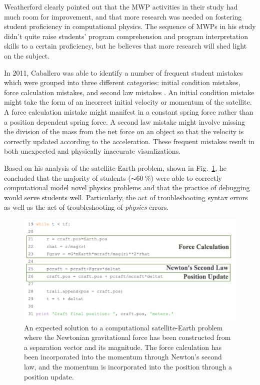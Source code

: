 \documentclass{msuphddissertation}
\begin{document}
\begin{doublespace}
Weatherford clearly pointed out that the MWP activities in their study had much room for improvement, and that more research was needed on fostering student proficiency in computational physics.  The sequence of MWPs in his study didn't quite raise 
students' program comprehension and program interpretation skills to a certain proficiency, but he believes that more research will shed light on the subject.

In 2011, Caballero was able to identify a number of frequent student mistakes which were grouped into three different categories: initial condition mistakes, force calculation mistakes, and second law mistakes \cite{Caballero2011}.  An initial condition mistake might take the form of an incorrect initial velocity or momentum of the satellite.  A force calculation mistake might manifest in a constant spring force rather than a position dependent spring force.  A second law mistake might involve missing the division of the mass from the net force on an object so that the velocity is correctly updated according to the acceleration.  These frequent mistakes result in both unexpected and physically inaccurate visualizations.

Based on his analysis of the satellite-Earth problem, shown in Fig.~\ref{CH2:Caballero}, he concluded that the majority of students ($\sim\SI{60}{\percent}$) were able to correctly computational model novel physics problems and that the practice of debugging would serve students well.  Particularly, the act of troubleshooting syntax errors as well as the act of troubleshooting of \textit{physics} errors.

\begin{figure}\center
\includegraphics[scale=0.8]{images/CH2Caballero.pdf}
\caption{An expected solution to a computational satellite-Earth problem where the Newtonian gravitational force has been constructed from a separation vector and its magnitude.  The force calculation has been incorporated into the momentum through Newton's second law, and the momentum is incorporated into the position through a position update.}\label{CH2:Caballero}
\end{figure}


\end{doublespace}
\end{document}
